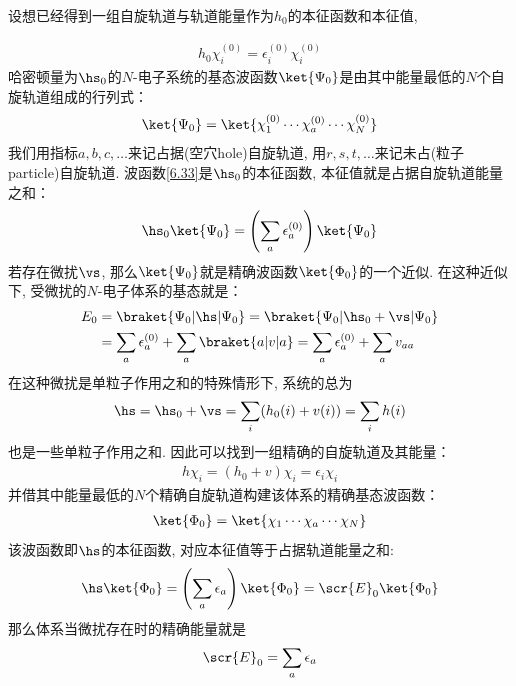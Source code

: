 设想已经得到一组自旋轨道与轨道能量作为$h_0$的本征函数和本征值,

\begin{align}
h_0\chi_i^{(0)} = \epsilon_i^{(0)} \chi_i^{(0)}
\end{align}
哈密顿量为$\hs_0$的$N$-电子系统的基态波函数$\ket{\Psi_0}$是由其中能量最低的$N$个自旋轨道组成的行列式：
\begin{align}\label{6.33}
\ket{\Psi_0} = \ket{\chi_1^{(0)}\cdots\chi_a^{(0)}\cdots\chi_N^{(0)}}
\end{align}
我们用指标$a,b,c,\ldots$来记占据(空穴hole)自旋轨道, 
用$r,s,t,\ldots$来记未占(粒子particle)自旋轨道. 
波函数\autoref{6.33}是$\hs_0$的本征函数, 
本征值就是占据自旋轨道能量之和：
\begin{align*}
\hs_0\ket{\Psi_0} = \left( \sum_a\epsilon_a^{(0)} \right)\ket{\Psi_0}
\end{align*}
若存在微扰$\vs$, 
那么$\ket{\Psi_0}$就是精确波函数$\ket{\Phi_0}$的一个近似. 
在这种近似下, 
受微扰的$N$-电子体系的基态就是：
\begin{align}\label{6.34}
E_0 & = \braket{\Psi_0|\hs|\Psi_0} = \braket{\Psi_0|\hs_0+\vs|\Psi_0}\notag\\
    & = \sum_a\epsilon_a^{(0)} + \sum_a\braket{a|v|a} = \sum_a\epsilon_a^{(0)} + \sum_av_{aa}
\end{align}
在这种微扰是单粒子作用之和的特殊情形下, 
系统的总\ha 为
\begin{align}
\hs = \hs_0 + \vs = \sum_i(h_0(i)+v(i)) = \sum_ih(i) 
\end{align}
也是一些单粒子作用之和. 
因此可以找到一组精确的自旋轨道及其能量：
\begin{align}
h\chi_i = (h_0+v)\chi_i = \epsilon_i\chi_i
\end{align}
并借其中能量最低的$N$个精确自旋轨道构建该体系的精确基态波函数：
\begin{align}
\ket{\Phi_0} = \ket{\chi_1\cdots\chi_a\cdots\chi_N}
\end{align}
该波函数即$\hs$的本征函数, 
对应本征值等于占据轨道能量之和:
\begin{align*}
\hs\ket{\Phi_0} = \left(\sum_a\epsilon_a \right)\ket{\Phi_0} = \scr{E}_0\ket{\Phi_0}
\end{align*}
那么体系当微扰存在时的精确能量就是
\begin{align}\label{6.38}
\scr{E}_0 = \sum_a\epsilon_a
\end{align}

